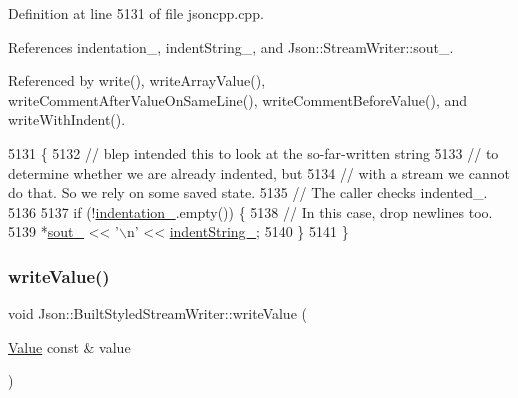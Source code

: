 Definition at line 5131 of file jsoncpp.\+cpp.



References indentation\+\_\+, indent\+String\+\_\+, and Json\+::\+Stream\+Writer\+::sout\+\_\+.



Referenced by write(), write\+Array\+Value(), write\+Comment\+After\+Value\+On\+Same\+Line(), write\+Comment\+Before\+Value(), and write\+With\+Indent().


\begin{DoxyCode}
5131                                           \{
5132   \textcolor{comment}{// blep intended this to look at the so-far-written string}
5133   \textcolor{comment}{// to determine whether we are already indented, but}
5134   \textcolor{comment}{// with a stream we cannot do that. So we rely on some saved state.}
5135   \textcolor{comment}{// The caller checks indented\_.}
5136 
5137   \textcolor{keywordflow}{if} (!\hyperlink{struct_json_1_1_built_styled_stream_writer_aaa4cbad91428ceca37cbabfc2a17a92d}{indentation\_}.empty()) \{
5138     \textcolor{comment}{// In this case, drop newlines too.}
5139     *\hyperlink{class_json_1_1_stream_writer_a4f5603d4228a9fa46a42cb44e5234d9b}{sout\_} << \textcolor{charliteral}{'\(\backslash\)n'} << \hyperlink{struct_json_1_1_built_styled_stream_writer_a0f8115a4fb474ab0e9de25f10e5ca09a}{indentString\_};
5140   \}
5141 \}
\end{DoxyCode}
\mbox{\label{struct_json_1_1_built_styled_stream_writer_a7c9da861861e570a51b45f270c9ff150}} 
\subsubsection{\texorpdfstring{write\+Value()}{writeValue()}}
{\footnotesize\ttfamily void Json\+::\+Built\+Styled\+Stream\+Writer\+::write\+Value (\begin{DoxyParamCaption}\item[{\hyperlink{class_json_1_1_value}{Value} const \&}]{value }\end{DoxyParamCaption})\hspace{0.3cm}{\ttfamily [private]}}



